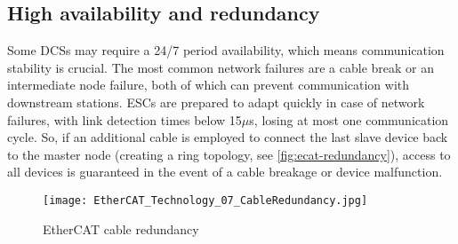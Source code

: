 \subsection{High availability and redundancy}

Some DCSs may require a 24/7 period availability, which means communication stability is crucial.
The most common network failures are a cable break or an intermediate node failure, both of which can prevent communication with downstream stations.
ESCs are prepared to adapt quickly in case of network failures, with link detection times below 15$\mu$s, losing at most one communication cycle.
So, if an additional cable is employed to connect the last slave device back to the master node (creating a ring topology, see \autoref{fig:ecat-redundancy}), access to all devices is guaranteed in the event of a cable breakage or device malfunction.

\begin{figure}[htp]
	\centering
	\texttt{[image: EtherCAT\_Technology\_07\_CableRedundancy.jpg]}
	\caption{EtherCAT cable redundancy \cite{protocol:ethercat}}
	\label{fig:ecat-redundancy}
\end{figure}


